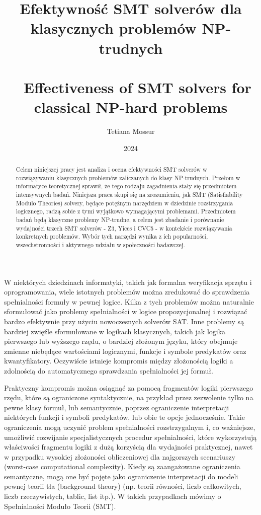 \documentclass[xodstep]{wnspt}
\author   {Tetiana Mossur}
\date     {2024}
\title{Efektywność SMT solverów dla klasycznych problemów NP-trudnych
\\{~}
\\{~}
Effectiveness of SMT solvers for classical NP-hard problems}
\begin{document}
\begin{abstract}
Celem niniejszej pracy jest analiza i ocena efektywności SMT solverów w rozwiązywaniu klasycznych problemów zaliczanych do klasy NP-trudnych. Przełom w informatyce teoretycznej sprawił, że tego rodzaju zagadnienia stały się przedmiotem intensywnych badań. Niniejsza praca skupi się na zrozumieniu, jak SMT (Satisfiability Modulo Theories) solvery, będące potężnym narzędziem w dziedzinie rozstrzygania logicznego, radzą sobie z tymi wyjątkowo wymagającymi problemami.
Przedmiotem badań będą klasyczne problemy NP-trudne, a celem jest zbadanie i porównanie wydajności trzech SMT solverów - Z3, Yices i CVC5 - w kontekście rozwiązywania konkretnych problemów. Wybór tych narzędzi wynika z ich popularności, wszechstronności i aktywnego udziału w społeczności badawczej.

\end{abstract}


\maketitle
\onehalfspacing

\introduction
W niektórych dziedzinach informatyki, takich jak formalna weryfikacja sprzętu i oprogramowania, wiele istotnych problemów można zredukować do sprawdzenia spełnialności formuły w pewnej logice. Kilka z tych problemów można naturalnie sformułować jako problemy spełnialności w logice propozycjonalnej i rozwiązać bardzo efektywnie przy użyciu nowoczesnych solverów SAT. Inne problemy są bardziej zwięźle sformułowane w logikach klasycznych, takich jak logika pierwszego lub wyższego rzędu, o bardziej złożonym języku, który obejmuje zmienne niebędące wartościami logicznymi, funkcje i symbole predykatów oraz kwantyfikatory. Oczywiście istnieje kompromis między złożonością logiki a zdolnością do automatycznego sprawdzania spełnialności jej formuł.

Praktyczny kompromis można osiągnąć za pomocą fragmentów logiki pierwszego rzędu, które są ograniczone syntaktycznie, na przykład przez zezwolenie tylko na pewne klasy formuł, lub semantycznie, poprzez ograniczenie interpretacji niektórych funkcji i symboli predykatów, lub obie te opcje jednocześnie. Takie ograniczenia mogą uczynić problem spełnialności rozstrzygalnym i, co ważniejsze, umożliwić rozwijanie specjalistycznych procedur spełnialności, które wykorzystują właściwości fragmentu logiki z dużą korzyścią dla wydajności praktycznej, nawet w przypadku wysokiej złożoności obliczeniowej dla najgorszych scenariuszy (worst-case computational complexity). Kiedy są zaangażowane ograniczenia semantyczne, mogą one być pojęte jako ograniczenie interpretacji do modeli pewnej teorii tła (background theory) (np. teorii równości, liczb całkowitych, liczb rzeczywistych, tablic, list itp.). W takich przypadkach mówimy o Spełnialności Moduło Teorii (SMT).
\end{document}
